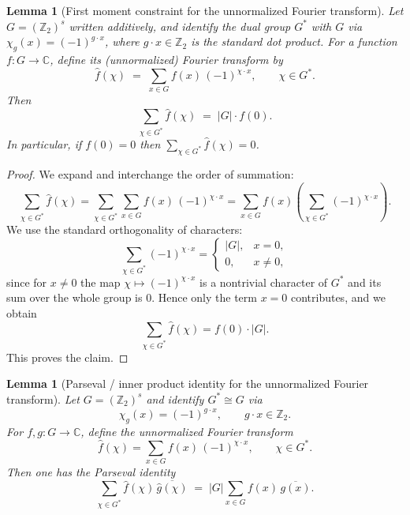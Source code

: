 \documentclass[12pt,twoside,]{amsart}
\theoremstyle{plain}
\newtheorem{lemma}[theorem]{Lemma}
\theoremstyle{definition}
\begin{document}
\begin{lemma}[First moment constraint for the unnormalized Fourier transform]\label{lem:first-moment}
Let $G=(\mathbb Z_2)^s$ written additively, and identify the dual group $G^*$ with $G$
via $\chi_g(x)=(-1)^{g\cdot x}$, where $g\cdot x\in\mathbb Z_2$ is the standard dot product.
For a function $f:G\to\mathbb C$, define its (unnormalized) Fourier transform by
\[
\widehat f(\chi)\;=\;\sum_{x\in G} f(x)\,(-1)^{\chi\cdot x},\qquad \chi\in G^*.
\]
Then
\[
\sum_{\chi\in G^*}\widehat f(\chi)\;=\;|G|\cdot f(0).
\]
In particular, if $f(0)=0$ then $\sum_{\chi\in G^*}\widehat f(\chi)=0$.
\end{lemma}

\begin{proof}
We expand and interchange the order of summation:
\[
\sum_{\chi\in G^*}\widehat f(\chi)
=\sum_{\chi\in G^*}\sum_{x\in G} f(x)\,(-1)^{\chi\cdot x}
=\sum_{x\in G} f(x)\left(\sum_{\chi\in G^*}(-1)^{\chi\cdot x}\right).
\]
We use the standard orthogonality of characters:
\[
\sum_{\chi\in G^*}(-1)^{\chi\cdot x}
=
\begin{cases}
|G|,& x=0,\\
0,& x\neq 0,
\end{cases}
\]
since for $x\neq 0$ the map $\chi\mapsto (-1)^{\chi\cdot x}$ is a nontrivial character of
$G^*$ and its sum over the whole group is $0$. Hence only the term $x=0$ contributes, and we
obtain
\[
\sum_{\chi\in G^*}\widehat f(\chi)=f(0)\cdot |G|.
\]
This proves the claim.
\end{proof}

\begin{lemma}[Parseval / inner product identity for the unnormalized Fourier transform]\label{lemma: Parseval}
Let $G=(\mathbb Z_2)^s$ and identify $G^*\cong G$ via
\[
\chi_g(x)=(-1)^{g\cdot x},\qquad g\cdot x\in \mathbb Z_2.
\]
For $f,g:G\to \mathbb C$, define the \emph{unnormalized} Fourier transform
\[
\widehat f(\chi)=\sum_{x\in G} f(x)\,(-1)^{\chi\cdot x},\qquad \chi\in G^*.
\]
Then one has the Parseval identity
\[
\sum_{\chi\in G^*}\widehat f(\chi)\,\overline{\widehat g(\chi)}
\;=\;
|G|\sum_{x\in G} f(x)\,\overline{g(x)}.
\]
\end{lemma}
\end{document}
